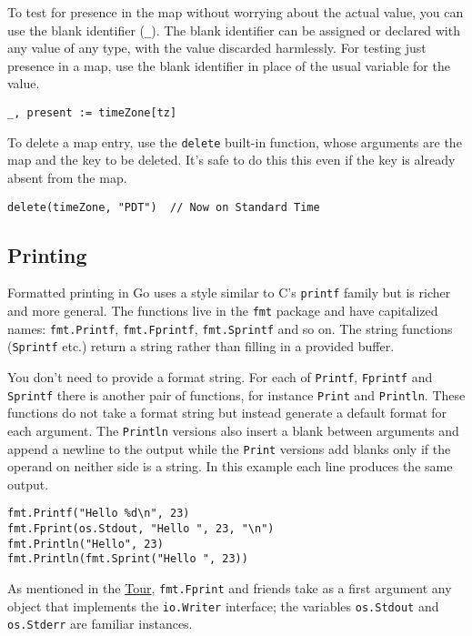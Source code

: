 To test for presence in the map without worrying about the actual value,
you can use the blank identifier (\texttt{\_}). The blank identifier can
be assigned or declared with any value of any type, with the value
discarded harmlessly. For testing just presence in a map, use the blank
identifier in place of the usual variable for the value.

\begin{Verbatim}[frame=single]
_, present := timeZone[tz]
\end{Verbatim}

To delete a map entry, use the \texttt{delete} built-in function, whose
arguments are the map and the key to be deleted. It's safe to do this
this even if the key is already absent from the map.

\begin{Verbatim}[frame=single]
delete(timeZone, "PDT")  // Now on Standard Time
\end{Verbatim}

\subsection*{Printing}

Formatted printing in Go uses a style similar to C's \texttt{printf}
family but is richer and more general. The functions live in the
\texttt{fmt} package and have capitalized names: \texttt{fmt.Printf},
\texttt{fmt.Fprintf}, \texttt{fmt.Sprintf} and so on. The string
functions (\texttt{Sprintf} etc.) return a string rather than filling in
a provided buffer.

You don't need to provide a format string. For each of \texttt{Printf},
\texttt{Fprintf} and \texttt{Sprintf} there is another pair of
functions, for instance \texttt{Print} and \texttt{Println}. These
functions do not take a format string but instead generate a default
format for each argument. The \texttt{Println} versions also insert a
blank between arguments and append a newline to the output while the
\texttt{Print} versions add blanks only if the operand on neither side
is a string. In this example each line produces the same output.

\begin{Verbatim}[frame=single]
fmt.Printf("Hello %d\n", 23)
fmt.Fprint(os.Stdout, "Hello ", 23, "\n")
fmt.Println("Hello", 23)
fmt.Println(fmt.Sprint("Hello ", 23))
\end{Verbatim}

As mentioned in the \href{http://tour.golang.org}{Tour},
\texttt{fmt.Fprint} and friends take as a first argument any object that
implements the \texttt{io.Writer} interface; the variables
\texttt{os.Stdout} and \texttt{os.Stderr} are familiar instances.

